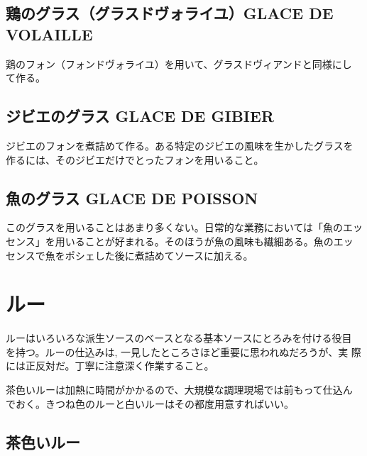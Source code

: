 \documentclass[twoside,12Q,b5paper]{escoffierltjsbook}
\begin{document}
\subsection*{鶏のグラス（グラスドヴォライユ）GLACE DE
VOLAILLE}\label{ux9d8fux306eux30b0ux30e9ux30b9ux30b0ux30e9ux30b9ux30c9ux30f4ux30a9ux30e9ux30a4ux30e6glace-de-volaille}

鶏のフォン（フォンドヴォライユ）を用いて、グラスドヴィアンドと同様にし
て作る。

\subsection*{ジビエのグラス GLACE DE
GIBIER}\label{ux30b8ux30d3ux30a8ux306eux30b0ux30e9ux30b9-glace-de-gibier}

ジビエのフォンを煮詰めて作る。ある特定のジビエの風味を生かしたグラスを
作るには、そのジビエだけでとったフォンを用いること。

\subsection*{魚のグラス GLACE DE
POISSON}\label{ux9b5aux306eux30b0ux30e9ux30b9-glace-de-poisson}

このグラスを用いることはあまり多くない。日常的な業務においては「魚のエッ
センス」を用いることが好まれる。そのほうが魚の風味も繊細ある。魚のエッ
センスで魚をポシェした後に煮詰めてソースに加える。

\section*{ルー}\label{ux30ebux30fc}

ルーはいろいろな派生ソースのベースとなる基本ソースにとろみを付ける役目
を持つ。ルーの仕込みは, 一見したところさほど重要に思われぬだろうが、実
際には正反対だ。丁寧に注意深く作業すること。

茶色いルーは加熱に時間がかかるので、大規模な調理現場では前もって仕込ん
でおく。きつね色のルーと白いルーはその都度用意すればいい。

\subsection*{茶色いルー}\label{ux8336ux8272ux3044ux30ebux30fc}
\end{document}
